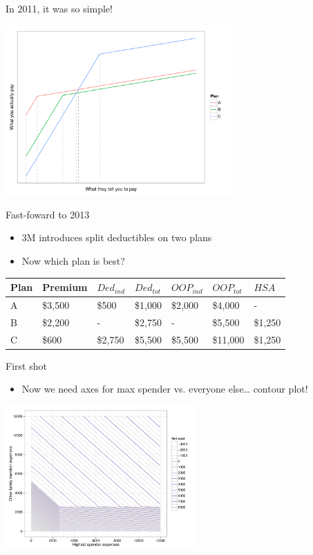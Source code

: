 \documentclass[sans,aspectratio=169,presentation,bigger,fleqn]{beamer}
\begin{document}
\begin{frame}[label=sec-12]{In 2011, it was so simple!}
\begin{center}
\includegraphics[height=6.5cm]{./img/ins-intersections.pdf}
\end{center}
\end{frame}
\begin{frame}[label=sec-13]{Fast-foward to 2013}
\begin{itemize}
\item 3M introduces split deductibles on two plans
\item Now which plan is best?
\end{itemize}

\footnotesize
\begin{center}
\begin{tabular}{lllllll}
\toprule
Plan & Premium & \(Ded_{ind}\) & \(Ded_{tot}\) & \(OOP_{ind}\) & \(OOP_{tot}\) & \(HSA\)\\
\midrule
A & \$3,500 & \$500 & \$1,000 & \$2,000 & \$4,000 & -\\
B & \$2,200 & - & \$2,750 & - & \$5,500 & \$1,250\\
C & \$600 & \$2,750 & \$5,500 & \$5,500 & \$11,000 & \$1,250\\
\bottomrule
\end{tabular}
\end{center}
\normalsize
\end{frame}
\begin{frame}[label=sec-14]{First shot}
\begin{itemize}
\item Now we need axes for max spender vs. everyone else\ldots{} contour plot!
\end{itemize}

\begin{center}
\includegraphics[height=5.5cm]{./img/ins-contour.pdf}
\end{center}
\end{frame}
\end{document}
